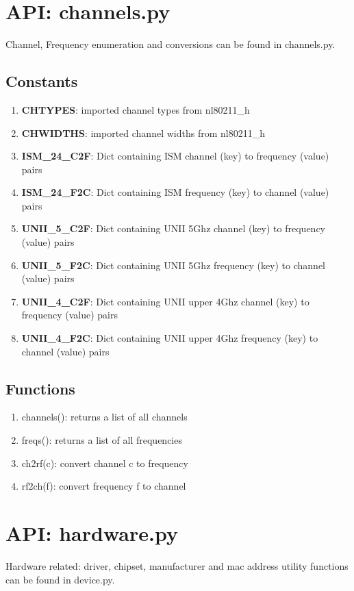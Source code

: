 \documentclass[11pt]{article}
\begin{document}
\begin{appendices}
\section{API: channels.py}\label{sec:channels.api}
Channel, Frequency enumeration and conversions can be found in channels.py.

\subsection{Constants}
\begin{enumerate}
\item \textbf{CHTYPES}: imported channel types from nl80211\_h
\item \textbf{CHWIDTHS}: imported channel widths from nl80211\_h
\item \textbf{ISM\_24\_C2F}: Dict containing ISM channel (key) to frequency (value) 
pairs
\item \textbf{ISM\_24\_F2C}: Dict containing ISM frequency (key) to channel (value)
pairs
\item \textbf{UNII\_5\_C2F}: Dict containing UNII 5Ghz channel (key) to frequency 
(value) pairs
\item \textbf{UNII\_5\_F2C}: Dict containing UNII 5Ghz frequency (key) to channel 
(value) pairs
\item \textbf{UNII\_4\_C2F}: Dict containing UNII upper 4Ghz channel (key) to 
frequency (value) pairs
\item \textbf{UNII\_4\_F2C}: Dict containing UNII upper 4Ghz frequency (key) to 
channel (value) pairs
\end{enumerate}

\subsection{Functions}
\begin{enumerate}
\item channels(): returns a list of all channels
\item freqs(): returns a list of all frequencies
\item ch2rf(c): convert channel c to frequency
\item rf2ch(f): convert frequency f to channel
\end{enumerate}

\section{API: hardware.py}\label{sec:hardwareapi}
Hardware related: driver, chipset, manufacturer and mac address utility functions 
can be found in device.py.


\end{appendices}
\end{document}
